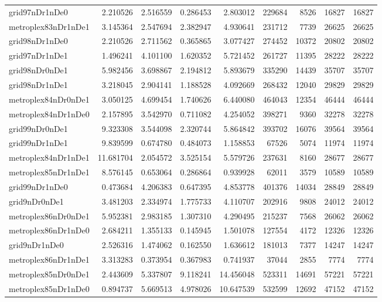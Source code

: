 \begin{longtable}{|l|r|r|r|r|r|r|r|r|}
grid97nDr1nDe0 & 2.210526 & 2.516559 & 0.286453 & 2.803012 & 229684 & 8526 & 16827 & 16827 \\
metroplex83nDr1nDe1 & 3.145364 & 2.547694 & 2.382947 & 4.930641 & 231712 & 7739 & 26625 & 26625 \\
grid98nDr1nDe0 & 2.210526 & 2.711562 & 0.365865 & 3.077427 & 274452 & 10372 & 20802 & 20802 \\
grid97nDr1nDe1 & 1.496241 & 4.101100 & 1.620352 & 5.721452 & 261727 & 11395 & 28222 & 28222 \\
grid98nDr0nDe1 & 5.982456 & 3.698867 & 2.194812 & 5.893679 & 335290 & 14439 & 35707 & 35707 \\
grid98nDr1nDe1 & 3.218045 & 2.904141 & 1.188528 & 4.092669 & 268432 & 12040 & 29829 & 29829 \\
metroplex84nDr0nDe1 & 3.050125 & 4.699454 & 1.740626 & 6.440080 & 464043 & 12354 & 46444 & 46444 \\
metroplex84nDr1nDe0 & 2.157895 & 3.542970 & 0.711082 & 4.254052 & 398271 & 9360 & 32278 & 32278 \\
grid99nDr0nDe1 & 9.323308 & 3.544098 & 2.320744 & 5.864842 & 393702 & 16076 & 39564 & 39564 \\
grid99nDr1nDe1 & 9.839599 & 0.674780 & 0.484073 & 1.158853 & 67526 & 5074 & 11974 & 11974 \\
metroplex84nDr1nDe1 & 11.681704 & 2.054572 & 3.525154 & 5.579726 & 237631 & 8160 & 28677 & 28677 \\
metroplex85nDr1nDe1 & 8.576145 & 0.653064 & 0.286864 & 0.939928 & 62011 & 3579 & 10589 & 10589 \\
grid99nDr1nDe0 & 0.473684 & 4.206383 & 0.647395 & 4.853778 & 401376 & 14034 & 28849 & 28849 \\
grid9nDr0nDe1 & 3.481203 & 2.334974 & 1.775733 & 4.110707 & 202916 & 9808 & 24012 & 24012 \\
metroplex86nDr0nDe1 & 5.952381 & 2.983185 & 1.307310 & 4.290495 & 215237 & 7568 & 26062 & 26062 \\
metroplex86nDr1nDe0 & 2.684211 & 1.355133 & 0.145945 & 1.501078 & 127554 & 4172 & 12326 & 12326 \\
grid9nDr1nDe0 & 2.526316 & 1.474062 & 0.162550 & 1.636612 & 181013 & 7377 & 14247 & 14247 \\
metroplex86nDr1nDe1 & 3.313283 & 0.373954 & 0.367983 & 0.741937 & 37044 & 2855 & 7774 & 7774 \\
metroplex85nDr0nDe1 & 2.443609 & 5.337807 & 9.118241 & 14.456048 & 523311 & 14691 & 57221 & 57221 \\
metroplex85nDr1nDe0 & 0.894737 & 5.669513 & 4.978026 & 10.647539 & 532599 & 12692 & 47152 & 47152 \\

\end{longtable}
